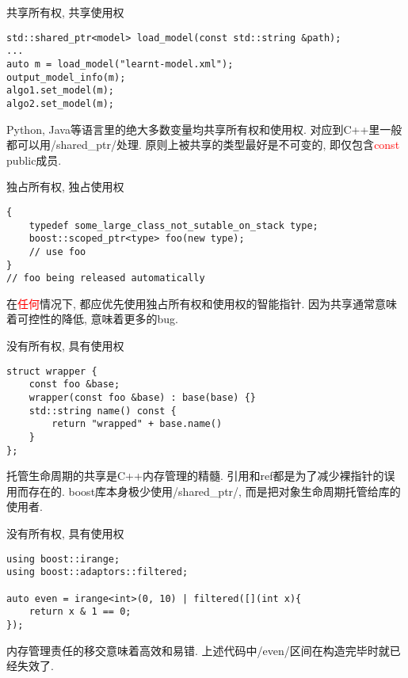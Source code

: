 \documentclass[compress]{beamer}
\begin{document}
\begin{frame}[fragile]{共享所有权, 共享使用权}
    \begin{verbatim}
std::shared_ptr<model> load_model(const std::string &path);
...
auto m = load_model("learnt-model.xml");
output_model_info(m);
algo1.set_model(m);
algo2.set_model(m);
    \end{verbatim}
    \vskip5mm
    Python, Java等语言里的绝大多数变量均共享所有权和使用权. 对应到C++里一般都可以用/shared_ptr/处理. 原则上被共享的类型最好是不可变的, 即仅包含\textcolor{red}{const} public成员.
\end{frame}

\begin{frame}[fragile]{独占所有权, 独占使用权}
    \begin{verbatim}
{
    typedef some_large_class_not_sutable_on_stack type;
    boost::scoped_ptr<type> foo(new type);
    // use foo
}
// foo being released automatically
    \end{verbatim}
    \vskip5mm
    在\textcolor{red}{任何}情况下, 都应优先使用独占所有权和使用权的智能指针. 因为共享通常意味着可控性的降低, 意味着更多的bug.
\end{frame}

\begin{frame}[fragile]{没有所有权, 具有使用权}
    \begin{verbatim}
struct wrapper {
    const foo &base;
    wrapper(const foo &base) : base(base) {}
    std::string name() const {
        return "wrapped" + base.name()
    }
};
    \end{verbatim}
    \vskip5mm
    托管生命周期的共享是C++内存管理的精髓. 引用和ref都是为了减少裸指针的误用而存在的. boost库本身极少使用/shared_ptr/, 而是把对象生命周期托管给库的使用者.
\end{frame}

\begin{frame}[fragile]{没有所有权, 具有使用权}
    \begin{verbatim}
using boost::irange;
using boost::adaptors::filtered;

auto even = irange<int>(0, 10) | filtered([](int x){
    return x & 1 == 0;
});
    \end{verbatim}
    \vskip5mm
    内存管理责任的移交意味着高效和易错. 上述代码中/even/区间在构造完毕时就已经失效了.
\end{frame}

\newcommand{\handle}{句柄(handle)}
\end{document}
